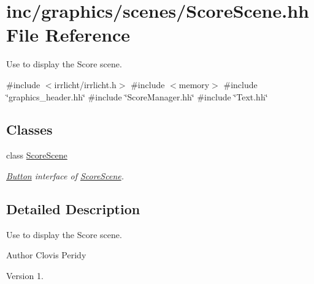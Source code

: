 \hypertarget{ScoreScene_8hh}{}\section{inc/graphics/scenes/\+Score\+Scene.hh File Reference}
\label{ScoreScene_8hh}


Use to display the Score scene.  


{\ttfamily \#include $<$irrlicht/irrlicht.\+h$>$}\newline
{\ttfamily \#include $<$memory$>$}\newline
{\ttfamily \#include \char`\"{}graphics\+\_\+header.\+hh\char`\"{}}\newline
{\ttfamily \#include \char`\"{}Score\+Manager.\+hh\char`\"{}}\newline
{\ttfamily \#include \char`\"{}Text.\+hh\char`\"{}}\newline
\subsection*{Classes}
\begin{DoxyCompactItemize}
\item 
class \hyperlink{classScoreScene}{Score\+Scene}
\begin{DoxyCompactList}\small\item\em \hyperlink{classButton}{Button} interface of \hyperlink{classScoreScene}{Score\+Scene}. \end{DoxyCompactList}\end{DoxyCompactItemize}


\subsection{Detailed Description}
Use to display the Score scene. 

\begin{DoxyAuthor}{Author}
Clovis Peridy 
\end{DoxyAuthor}
\begin{DoxyVersion}{Version}
1. 
\end{DoxyVersion}
